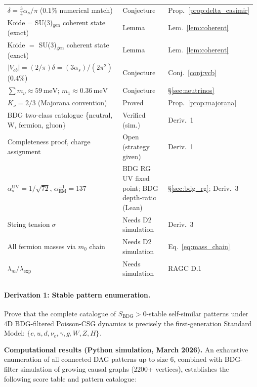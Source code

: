 \documentclass[11pt,a4paper]{article}
\newcommand{\SBDG}{S_{\mathrm{BDG}}}
\begin{document}
\begin{center}
\begin{tabular}{p{5.5cm}ll}
$\delta = \tfrac{3}{4}\alpha_s/\pi$ ($0.1\%$ numerical match) & Conjecture & Prop.~\ref{prop:delta_casimir} \\
Koide = SU(3)$_\text{gen}$ coherent state (exact) & Lemma & Lem.~\ref{lem:coherent} \\
Koide $=$ SU(3)$_{\mathrm{gen}}$ coherent state (exact) & Lemma & Lem.~\ref{lem:coherent} \\
$|V_{cb}| = (2/\pi)\delta = (3\alpha_s)/(2\pi^2)$ ($0.4\%$) & Conjecture & Conj.~\ref{conj:vcb} \\
$\sum m_\nu \approx 59~\mathrm{meV}$; $m_1 \approx 0.36~\mathrm{meV}$ & Conjecture & \S\ref{sec:neutrinos} \\
$K_\nu = 2/3$ (Majorana convention) & Proved & Prop.~\ref{prop:majorana} \\
\midrule
BDG two-class catalogue \{neutral, W, fermion, gluon\} & Verified (sim.) & Deriv.~1 \\
Completeness proof, charge assignment & Open (strategy given) & Deriv.~1 \\
$\alpha_s^{\mathrm{UV}} = 1/\sqrt{72}$, $\alpha^{-1}_{\mathrm{EM}} = 137$ & BDG RG UV fixed point; BDG depth-ratio (Lean) & \S\ref{sec:bdg_rg}; Deriv.~3 \\
String tension $\sigma$ & Needs D2 simulation & Deriv.~3 \\
All fermion masses via $m_0$ chain & Needs D2 simulation & Eq.~\eqref{eq:mass_chain} \\
$\lambda_m/\lambda_{\mathrm{exp}}$ & Needs simulation & RAGC D.1 \\
\bottomrule
\end{tabular}
\end{center}

\paragraph{Derivation 1: Stable pattern enumeration.}
Prove that the complete catalogue of $\SBDG > 0$-stable self-similar patterns
under 4D BDG-filtered Poisson-CSG dynamics is precisely the first-generation
Standard Model: $\{e, u, d, \nu_e, \gamma, g, W, Z, H\}$.

\textbf{Computational results (Python simulation, March 2026).}
An exhaustive enumeration of all connected DAG patterns up to size 6, combined
with BDG-filter simulation of growing causal graphs (2200+ vertices), establishes
the following score table and pattern catalogue:
\end{document}
